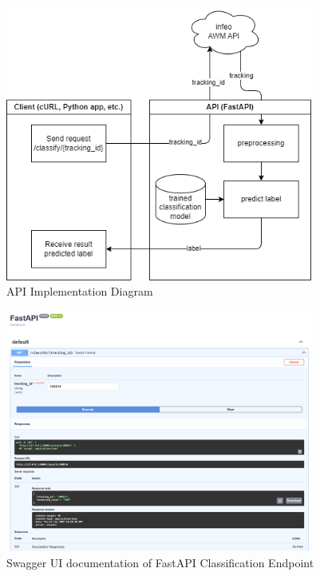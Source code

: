 \documentclass[a4paper,12pt,twoside]{scrreprt}
\begin{document}
\begin{figure}[htbp]
  \centering

  \includegraphics[width=0.9\textwidth]{Diagrams/drawio/api/api_implementation.png}
  \caption{API Implementation Diagram}
  \label{fig:fastapi_implementation_diagram}
\end{figure}

\begin{figure}[htbp]
  \centering

  \includegraphics[width=0.9\textwidth]{Figures/api/fastapi_documentation.png}
  \caption{Swagger UI documentation of FastAPI Classification Endpoint}
  \label{fig:fastapi_docs}
\end{figure}
\end{document}
